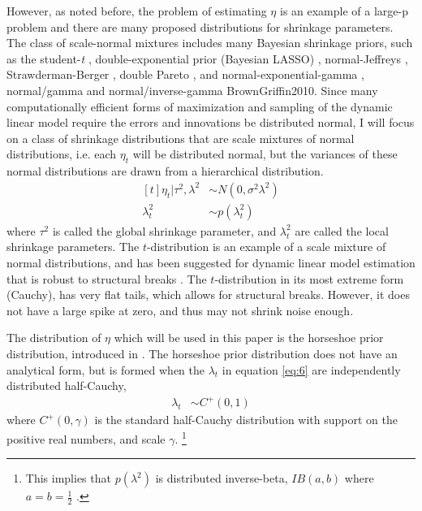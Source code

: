\documentclass{article}
\begin{document}
However, as noted before, the problem of estimating $\eta$ is an example of a large-p problem and there are many proposed distributions for shrinkage parameters.
The class of scale-normal mixtures includes many Bayesian shrinkage priors, such as the student-\textit{t} \parencite{Tipping2001}, double-exponential prior (Bayesian LASSO) \parencites{LiGoel2006}{ParkCasella2008}{Hans2009}, normal-Jeffreys \parencites{FigueiredoMember2003}{BaeMallick2004}, Strawderman-Berger \parencites{Strawderman1971}{Berger1980}, double Pareto \parencite{ArmaganDunsonLee2011},  and normal-exponential-gamma \parencite{BrownGriffin2005}, normal/gamma and normal/inverse-gamma \parencite{CaronDoucet2008}{BrownGriffin2010}.
Since many computationally efficient forms of maximization and sampling of the dynamic linear model require the errors and innovations be distributed normal, I will focus on a class of shrinkage distributions that are scale mixtures of normal distributions, i.e. each $\eta_{t}$ will be distributed normal, but the variances of these normal distributions are drawn from a hierarchical distribution.
\begin{equation}
  \label{eq:6}
  \begin{aligned}[t]
    \eta_{t} | \tau^{2}, \lambda^{2} & \sim N(0, \sigma^{2} \lambda^{2}) \\
    \lambda_{t}^{2} & \sim p(\lambda^{2}_{t})
  \end{aligned}
\end{equation}
where $\tau^{2}$ is called the global shrinkage parameter, and $\lambda_{t}^{2}$ are called the local shrinkage parameters.
The $t$-distribution is an example of a scale mixture of normal distributions, and has been suggested for dynamic linear model estimation that is robust to structural breaks \parencites{HarveyKoopman2000}{PetrisPetroneEtAl2009}.
The $t$-distribution in its most extreme form (Cauchy), has very flat tails, which allows for structural breaks.
However, it does not have a large spike at zero, and thus may not shrink noise enough.

The distribution of $\eta$ which will be used in this paper is the horseshoe prior distribution, introduced in \textcites{CarvalhoPolsonScott2009}{CarvalhoPolsonScott2010}.
The horseshoe prior distribution does not have an analytical form, but is formed when the $\lambda_{t}$ in equation \eqref{eq:6} are independently distributed half-Cauchy,
\begin{align}
  \label{eq:13}
  \lambda_{t} &\sim C^{+}(0, 1)
\end{align}
where $C^{+}(0, \gamma)$ is the standard half-Cauchy distribution with support on the positive real numbers, and scale $\gamma$.%
\footnote{
  This implies that $p(\lambda^{2})$ is distributed inverse-beta, $IB(a, b)$ where $a = b = \frac{1}{2}$ \parencite[4]{PolsonScott2010}. 
}
\end{document}

